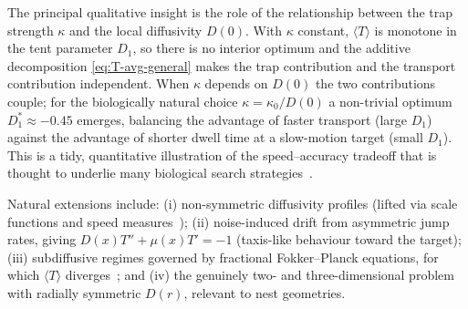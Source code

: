 The principal qualitative insight is the role of the relationship between the
trap strength $\kappa$ and the local diffusivity $D(0)$.  With $\kappa$
constant, $\langle T\rangle$ is monotone in the tent parameter $D_1$, so there
is no interior optimum and the additive decomposition \eqref{eq:T-avg-general}
makes the trap contribution and the transport contribution independent.  When
$\kappa$ depends on $D(0)$ the two contributions couple; for the biologically
natural choice $\kappa=\kappa_0/D(0)$ a non-trivial optimum $D_1^*\approx -0.45$
emerges, balancing the advantage of faster transport (large $D_1$) against
the advantage of shorter dwell time at a slow-motion target (small $D_1$).
This is a tidy, quantitative illustration of the speed--accuracy tradeoff that
is thought to underlie many biological search
strategies~\cite{Benichou2011,Peleg2018}.

Natural extensions include: (i) non-symmetric diffusivity profiles (lifted
via scale functions and speed measures~\cite{Pavliotis2014,Gardiner2009});
(ii) noise-induced drift from asymmetric jump rates, giving
$D(x)T''+\mu(x)T'=-1$ (taxis-like behaviour toward the target); (iii)
subdiffusive regimes governed by fractional Fokker--Planck equations,
for which $\langle T\rangle$ diverges~\cite{Metzler2000}; and (iv) the
genuinely two- and three-dimensional problem with radially symmetric $D(r)$,
relevant to nest geometries.
